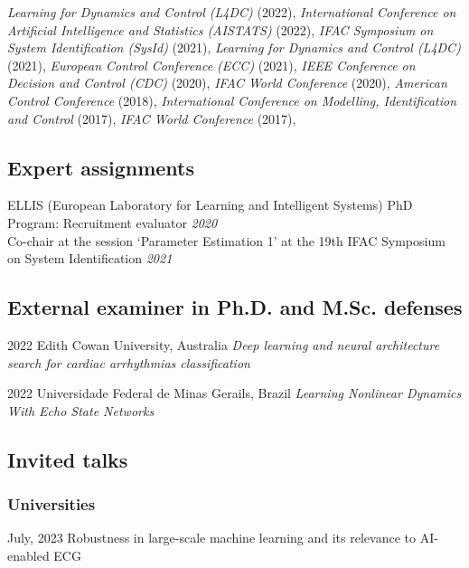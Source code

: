 \documentclass[10pt,letterpaper]{article} %
\begin{document}
 {\em Learning for Dynamics and Control (L4DC) } (2022),  {\em International Conference on Artificial Intelligence and Statistics (AISTATS) } (2022),  {\em IFAC Symposium on System Identification (SysId) } (2021),  {\em Learning for Dynamics and Control (L4DC) } (2021),  {\em European Control Conference (ECC) } (2021),  {\em IEEE Conference on Decision and Control (CDC) } (2020),  {\em IFAC World Conference } (2020),  {\em American Control Conference } (2018),  {\em International Conference on Modelling, Identification and Control } (2017),  {\em IFAC World Conference } (2017), 

\subsection*{Expert assignments}

 ELLIS (European Laboratory for Learning and Intelligent Systems) PhD Program: Recruitment evaluator \hfill {\em 2020 } \\  Co-chair at the session `Parameter Estimation 1' at the 19th IFAC Symposium on System Identification \hfill {\em 2021 } \\ 

\subsection*{External examiner in Ph.D. and M.Sc. defenses}


    { 2022 }
    {  }
    { Edith Cowan University, Australia }
    { {\it Deep learning and neural architecture search for cardiac arrhythmias classification } }

    { 2022 }
    {  }
    { Universidade Federal de Minas Gerails, Brazil }
    { {\it Learning Nonlinear Dynamics With Echo State Networks } }



\subsection*{Invited talks}

\subsubsection*{Universities}

    
    { July, 2023 }
    { Robustness in large-scale machine learning and its relevance to AI-enabled ECG  }
    { }{}
    
\end{document}
